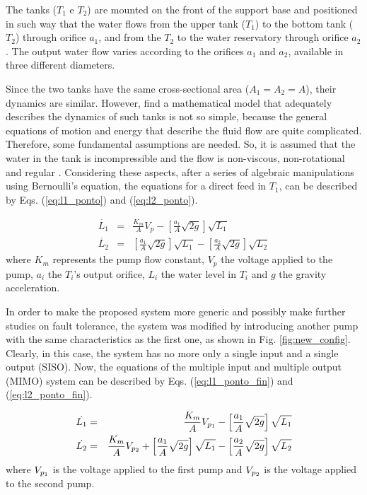 \documentclass[10pt,fleqn,a4paper]{article}
\begin{document}
The tanks ($T_1$ e $T_2$) are mounted on the front of the support base and
positioned in such way that the water flows from the upper tank ($T_1$) to the
bottom tank ($T_2$) through orifice $a_1$, and from the $T_2$ to the water
reservatory through orifice $a_2$. The output water flow varies according to the
orifices $a_1$ and $a_2$, available in three different diameters.

Since the two tanks have the same cross-sectional area ($A_1 = A_2 = A$), their
dynamics are similar. However, find a mathematical model that adequately
describes the dynamics of such tanks is not so simple, because the general
equations of motion and energy that describe the fluid flow are quite
complicated. Therefore, some fundamental assumptions are needed. So, it is
assumed that the water in the tank is incompressible and the flow is
non-viscous, non-rotational and regular \citep{dorf:2009}. Considering these
aspects, after a series of algebraic manipulations using Bernoulli's equation,
the equations for a direct feed in $T_1$, can be described by Eqs.
(\ref{eq:l1_ponto}) and (\ref{eq:l2_ponto}).

\begin{eqnarray}
\dot{L_1} & = & \frac{K_m}{A}V_p -
                \left[\frac{a_1}{A}\sqrt{2g}\right]\sqrt{L_1}
                \label{eq:l1_ponto}\\
\dot{L_2} & = & \left[\frac{a_1}{A}\sqrt{2g}\right]\sqrt{L_1} -
                \left[\frac{a_2}{A}\sqrt{2g}\right]\sqrt{L_2}
                \label{eq:l2_ponto}
\end{eqnarray}
%
where $K_m$ represents the pump flow constant, $V_p$ the voltage applied to the
pump, $a_i$ the $T_i$'s output orifice, $L_i$ the water level in $T_i$ and $g$
the gravity acceleration.

In order to make the proposed system more generic and possibly make further
studies on fault tolerance, the system was modified by introducing another pump
with the same characteristics as the first one, as shown in Fig.
\ref{fig:new_config}. Clearly, in this case, the system has no more only a single
input and a single output (SISO). Now, the equations of the multiple input and
multiple output (MIMO) system can be described by Eqs. (\ref{eq:l1_ponto_fin})
and (\ref{eq:l2_ponto_fin}).

\begin{eqnarray}
\dot{L_1} & = & \frac{K_m}{A}V_{p_{\tiny 1}} -
                \left[\frac{a_1}{A}\sqrt{2g}\right]\sqrt{L_1}
                \label{eq:l1_ponto_fin}\\
\dot{L_2} & = & \frac{K_m}{A}V_{p_{\tiny 2}} +
                \left[\frac{a_1}{A}\sqrt{2g}\right]\sqrt{L_1} -
                \left[\frac{a_2}{A}\sqrt{2g}\right]\sqrt{L_2}
                \label{eq:l2_ponto_fin}
\end{eqnarray}
%
where $V_{p_{\tiny 1}}$ is the voltage applied to the first pump and
$V_{p_{\tiny 2}}$ is the voltage applied to the second pump.
\end{document}
